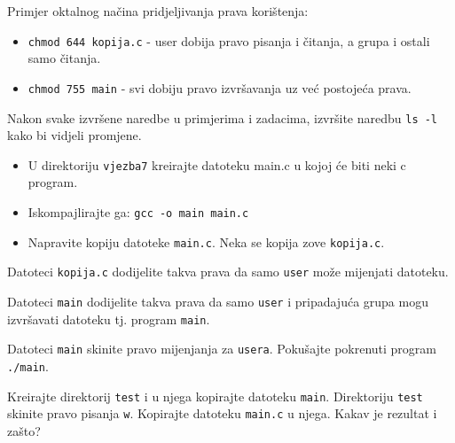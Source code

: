\begin{primjer}Primjer oktalnog načina pridjeljivanja prava korištenja:
\begin{itemize}
 \item \texttt{chmod 644 kopija.c} - user dobija pravo pisanja i čitanja, a grupa i ostali samo čitanja.
\item \texttt{chmod 755 main} - svi dobiju pravo izvršavanja uz već postojeća prava.
\end{itemize}
\end{primjer}
\begin{zadatak} Nakon svake izvršene naredbe u primjerima i zadacima, izvršite naredbu \texttt{ls -l} kako bi vidjeli promjene.
\begin{itemize}
\item U direktoriju \texttt{vjezba7} kreirajte datoteku main.c u kojoj će biti neki c program.
\item Iskompajlirajte ga: \texttt{gcc -o main main.c} 
\item Napravite kopiju datoteke \texttt{main.c}. Neka se kopija zove \texttt{kopija.c}.
\end{itemize}
\end{zadatak}
\begin{zadatak}
Datoteci \texttt{kopija.c} dodijelite takva prava da samo \texttt{user} može mijenjati datoteku. 
\end{zadatak}
\begin{zadatak}
Datoteci \texttt{main} dodijelite takva prava da samo \texttt{user} i pripadajuća grupa mogu izvršavati datoteku tj. program \texttt{main}. 
\end{zadatak}
\begin{zadatak}
Datoteci \texttt{main} skinite pravo mijenjanja za \texttt{usera}. Pokušajte pokrenuti program \texttt{./main}. 
\end{zadatak}
\begin{zadatak}
Kreirajte direktorij \texttt{test} i u njega kopirajte datoteku \texttt{main}. Direktoriju \texttt{test} skinite pravo pisanja \texttt{w}. 
Kopirajte datoteku \texttt{main.c} u njega. Kakav je rezultat i zašto? 
\end{zadatak}

\begin{comment}

\vfill
\begin{itemize}
\renewcommand{\labelitemi}{\textbf{$\rightarrow$}}
\item Popis svih pokrenutih naredbi eksportirajte u datoteku imena \texttt{prezime\_ime\_vj7.txt}. Uploadajte datoteku na \href{https://moodle.oss.unist.hr/course/view.php?id=133}{http://moodle.oss.unist.hr}.
\end{itemize}

\end{comment}
